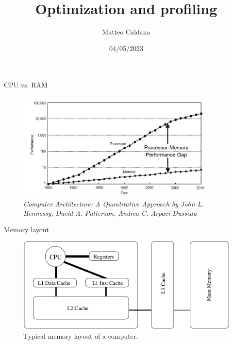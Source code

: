 \documentclass[10pt,aspectratio=169]{beamer}
\begin{document}
    \title{Optimization and profiling}
    \author{Matteo Caldana}
    \date{04/05/2023}

\begin{frame}
    \maketitle
\end{frame}

\begin{frame}{CPU vs. RAM}
    \begin{figure}
        \centering
        \includegraphics[width=0.9\textwidth]{images/cpu_memory_performance_gap.png}
        \caption{\textit{Computer Architecture: A Quantitative Approach by John L. Hennessy, David A. Patterson, Andrea C. Arpaci-Dusseau}}
    \end{figure}
\end{frame}

\begin{frame}{Memory layout}
    \begin{figure}
        \centering
        \includegraphics[width=\textwidth]{images/memory_layout.png}
        \caption{Typical memory layout of a computer.}
    \end{figure}
\end{frame}
\end{document}
